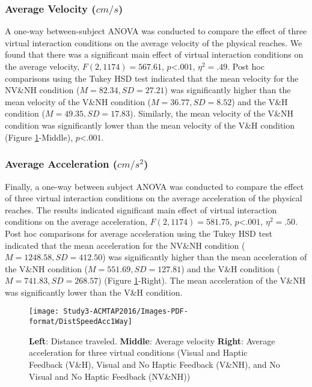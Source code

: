 \subsubsection{Average Velocity ($cm/s$)}
A one-way between-subject ANOVA was conducted to compare the effect of three virtual interaction conditions on the average velocity of the physical reaches. We found that there was a significant main effect of virtual interaction conditions on the average velocity, $F(2,1174)=567.61$, $p$\textless$.001$, $\eta^{2}=.49$. Post hoc comparisons using the Tukey HSD test indicated that the mean velocity for the NV\&NH condition ($M=82.34, SD=27.21$) was significantly higher than the mean velocity of the V\&NH condition ($M=36.77, SD=8.52$) and the V\&H condition ($M=49.35, SD=17.83$). Similarly, the mean velocity of the V\&NH condition was significantly lower than the mean velocity of the V\&H condition (Figure \ref{fig:DistSpeed}-Middle), $p$\textless$.001$.

\subsubsection{Average Acceleration ($cm/s^2$)}
Finally, a one-way between subject ANOVA was conducted to compare the effect of three virtual interaction conditions on the average acceleration of the physical reaches. The results indicated significant main effect of virtual interaction conditions on the average acceleration, $F(2,1174)=581.75$, $p$\textless$.001$, $\eta^{2}=.50$. Post hoc comparisons for average acceleration using the Tukey HSD test indicated that the mean acceleration for the NV\&NH condition ($M=1248.58, SD=412.50$) was significantly higher than the mean acceleration of the V\&NH condition ($M=551.69, SD=127.81$) and the V\&H condition ($M=741.83, SD=268.57$) (Figure \ref{fig:DistSpeed}-Right). The mean acceleration of the V\&NH was significantly lower than the V\&H condition. 

\begin{figure}[!htb]
	\centering
	\texttt{[image: Study3-ACMTAP2016/Images-PDF-format/DistSpeedAcc1Way]}
	\caption{\textsf{\textbf{Left}: Distance traveled. \textbf{Middle}: Average velocity \textbf{Right}: Average acceleration for three virtual conditions (Visual and Haptic Feedback (V\&H), Visual and No Haptic Feedback (V\&NH), and No Visual and No Haptic Feedback (NV\&NH))}}
	\label{fig:DistSpeed}	
\end{figure}



